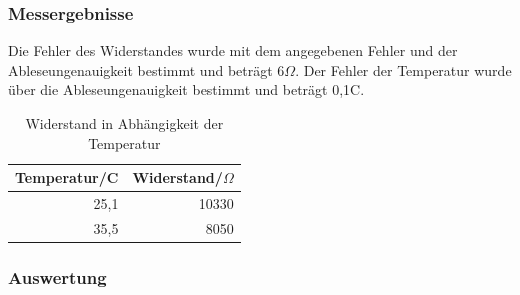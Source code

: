 \documentclass[12pt,a4paper]{article}
\begin{document}
\subsubsection*{Messergebnisse}

Die Fehler des Widerstandes wurde mit dem angegebenen Fehler und der Ableseungenauigkeit bestimmt und beträgt 6$\Omega$. Der Fehler der Temperatur wurde über die Ableseungenauigkeit bestimmt und beträgt 0,1C.

\begin{table}[H]
\begin{center}
\begin{tabular}{|r|r|}
\hline
\multicolumn{1}{|l|}{Temperatur/C} & \multicolumn{1}{l|}{Widerstand/$\Omega$} \\ \hline
25,1 & 10330 \\ \hline
35,5 & 8050 \\ \hline
\end{tabular}
\end{center}
\caption{Widerstand in Abhängigkeit der Temperatur}
\label{tab:2_2}
\end{table}


\subsubsection*{Auswertung}
\end{document}
